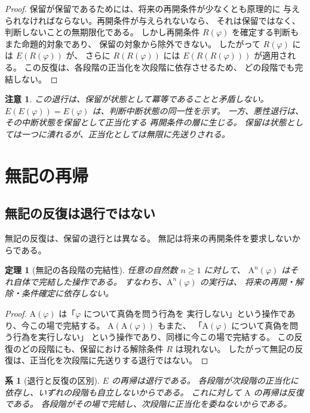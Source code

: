 \documentclass[11pt,a4paper,ja=standard,lualatex]{bxjsarticle}
\newtheorem{theorem}{定理}
\newtheorem{corollary}{系}
\newtheorem{remark}{注意}
\begin{document}
\begin{proof}
保留が保留であるためには、将来の再開条件が少なくとも原理的に
与えられなければならない。再開条件が与えられないなら、
それは保留ではなく、判断しないことの無期限化である。
しかし再開条件 $R(\varphi)$ を確定する判断もまた命題的対象であり、
保留の対象から除外できない。
したがって $R(\varphi)$ には $E(R(\varphi))$ が、
さらに $R(R(\varphi))$ には $E(R(R(\varphi)))$ が適用される。
この反復は、各段階の正当化を次段階に依存させるため、
どの段階でも完結しない。
\end{proof}

\begin{remark}
この退行は、保留が状態として冪等であることと矛盾しない。
$E(E(\varphi))=E(\varphi)$ は、判断中断状態の同一性を示す。
一方、悪性退行は、その中断状態を保留として正当化する
再開条件の層に生じる。
保留は状態としては一つに潰れるが、正当化としては無限に先送りされる。
\end{remark}

\section{無記の再帰}

\subsection{無記の反復は退行ではない}

無記の反復は、保留の退行とは異なる。
無記は将来の再開条件を要求しないからである。

\begin{theorem}[無記の各段階の完結性]
任意の自然数 $n\geq1$ に対して、
$\mathrm{A}^{n}(\varphi)$ はそれ自体で完結した操作である。
すなわち、$\mathrm{A}^{n}(\varphi)$ の実行は、
将来の再開・解除・条件確定に依存しない。
\end{theorem}

\begin{proof}
$\mathrm{A}(\varphi)$ は「$\varphi$ について真偽を問う行為を
実行しない」という操作であり、今この場で完結する。
$\mathrm{A}(\mathrm{A}(\varphi))$ もまた、
「$\mathrm{A}(\varphi)$ について真偽を問う行為を実行しない」
という操作であり、同様に今この場で完結する。
この反復のどの段階にも、保留における解除条件 $R$ は現れない。
したがって無記の反復は、正当化を次段階に先送りする退行ではない。
\end{proof}

\begin{corollary}[退行と反復の区別]
$E$ の再帰は退行である。
各段階が次段階の正当化に依存し、いずれの段階も自立しないからである。
これに対して $\mathrm{A}$ の再帰は反復である。
各段階がその場で完結し、次段階に正当化を委ねないからである。
\end{corollary}
\end{document}
